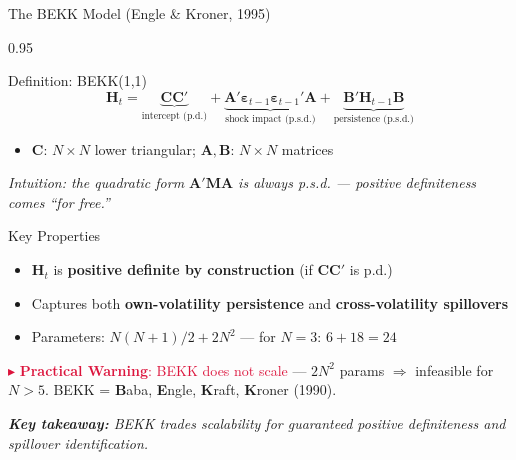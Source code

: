 \documentclass[9pt, aspectratio=169, t]{beamer}
\begin{document}
\begin{frame}{The BEKK Model (Engle \& Kroner, 1995)}
    \begin{cminipage}{0.95\textwidth}
    \vspace{-2mm}
    {\scriptsize
    \begin{block}{Definition: BEKK(1,1)}
        \[
            \mathbf{H}_t = \underbrace{\mathbf{C}\mathbf{C}'}_{\text{intercept (p.d.)}} + \underbrace{\mathbf{A}'\boldsymbol{\varepsilon}_{t-1}\boldsymbol{\varepsilon}_{t-1}'\mathbf{A}}_{\text{shock impact (p.s.d.)}} + \underbrace{\mathbf{B}'\mathbf{H}_{t-1}\mathbf{B}}_{\text{persistence (p.s.d.)}}
        \]
        \vspace{-2mm}
        \begin{itemize}\setlength{\itemsep}{0pt}
            \item $\mathbf{C}$: $N \times N$ lower triangular; $\mathbf{A}, \mathbf{B}$: $N \times N$ matrices
        \end{itemize}
        \textit{Intuition: the quadratic form $\mathbf{A}'\mathbf{M}\mathbf{A}$ is always p.s.d. --- positive definiteness comes ``for free.''}
    \end{block}
    \vspace{-1mm}
    \begin{block}{Key Properties}
        \begin{itemize}\setlength{\itemsep}{0pt}
            \item $\mathbf{H}_t$ is \textbf{positive definite by construction} (if $\mathbf{C}\mathbf{C}'$ is p.d.)
            \item Captures both \textbf{own-volatility persistence} and \textbf{cross-volatility spillovers}
            \item Parameters: $N(N+1)/2 + 2N^2$ --- for $N=3$: $6 + 18 = 24$
        \end{itemize}
    \end{block}
    \vspace{-1mm}
    \textcolor{Crimson}{$\blacktriangleright$ \textbf{Practical Warning}: BEKK does not scale} --- $2N^2$ params $\Rightarrow$ infeasible for $N > 5$.
    BEKK = \textbf{B}aba, \textbf{E}ngle, \textbf{K}raft, \textbf{K}roner (1990).
    \vspace{1mm}

    \textit{\textbf{Key takeaway:} BEKK trades scalability for guaranteed positive definiteness and spillover identification.}
    }
    \end{cminipage}
\end{frame}
\end{document}

